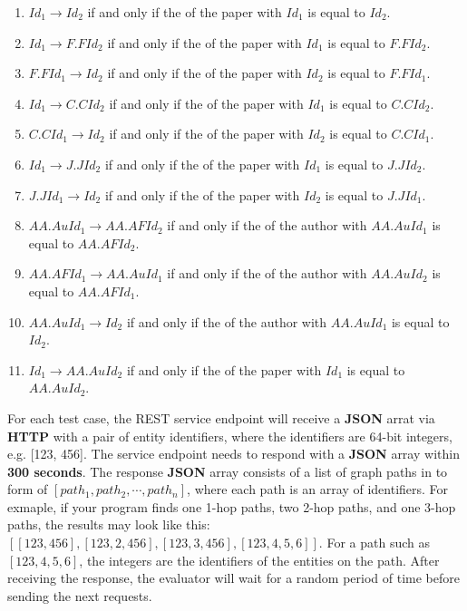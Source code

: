 \documentclass[hyperref,UTF8]{ctexart}
\theoremstyle{definition}
\theoremstyle{remark}
\numberwithin{equation}{subsection}
\newcommand{\Emph}{\textbf}
\begin{document}
	\begin{enumerate}[(1)]
		
		\item $Id_1 \rightarrow Id_2$ if and only if the  of the paper
		with $Id_1$ is equal to $Id_2$.
		
		\item $Id_1 \rightarrow F.FId_2$ if and only if the  of the paper
		with $Id_1$ is equal to $F.FId_2$.
		
		\item $F.FId_1 \rightarrow Id_2$ if and only if the  of the paper
		with $Id_2$ is equal to $F.FId_1$.
		
		\item $Id_1 \rightarrow C.CId_2$ if and only if the  of the paper
		with $Id_1$ is equal to $C.CId_2$.
		
		\item $C.CId_1 \rightarrow Id_2$ if and only if the  of the paper
		with $Id_2$ is equal to $C.CId_1$.
		
		\item $Id_1 \rightarrow J.JId_2$ if and only if the  of the paper
		with $Id_1$ is equal to $J.JId_2$.
		
		\item $J.JId_1 \rightarrow Id_2$ if and only if the  of the paper
		with $Id_2$ is equal to $J.JId_1$.
		
		\item $AA.AuId_1 \rightarrow AA.AFId_2$ if and only if the  of the author
		with $AA.AuId_1$ is equal to $AA.AFId_2$.
		
		\item $AA.AFId_1 \rightarrow AA.AuId_1$ if and only if the  of the author
		with $AA.AuId_2$ is equal to $AA.AFId_1$.
		
		\item $AA.AuId_1 \rightarrow Id_2$ if and only if the  of the author
		with $AA.AuId_1$ is equal to $Id_2$.
		
		\item $Id_1 \rightarrow AA.AuId_2$ if and only if the  of the paper
		with $Id_1$ is equal to $AA.AuId_2$.
		
		
	\end{enumerate}
	For each test case, the REST service endpoint will receive a
	\Emph{JSON} arrat via \Emph{HTTP} with a pair of entity identifiers,
	where the identifiers are 64-bit integers, e.g. [123, 456].
	The service endpoint needs to respond with a \Emph{JSON} array within \Emph{300 seconds}.
	The response \Emph{JSON} array consists of a list of graph paths in to form of
	$[path_1, path_2, \cdots, path_n]$, where each path is an array of identifiers.
	For exmaple, if your program finds one 1-hop paths, two 2-hop paths, and one 3-hop paths,
	the results may look like this:
	$[[123, 456], [123, 2, 456], [123, 3, 456], [123, 4, 5, 6]]$.
	For a path such as $[123, 4, 5, 6]$, the integers are the identifiers of the entities on the path.
	After receiving the response, the evaluator will wait for a random period of time
	before sending the next requests.
	
\end{document}

